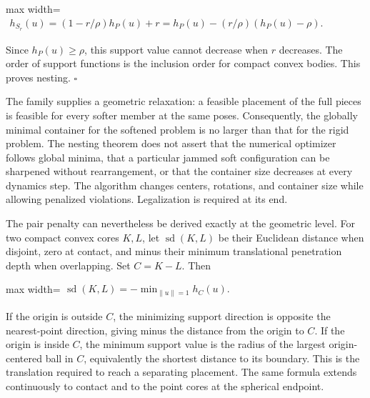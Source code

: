 \documentclass[11pt,a4paper]{article}
\begin{document}
\begin{center}\begin{adjustbox}{max width=\linewidth}$\displaystyle\begin{aligned}
h_{S_r}(u)=(1-r/\rho)h_P(u)+r
=h_P(u)-(r/\rho)(h_P(u)-\rho).
\end{aligned}$\end{adjustbox}\end{center}

Since \(h_P(u)\ge\rho\), this support value cannot decrease when \(r\) decreases. The order of support functions is the inclusion order for compact convex bodies. This proves nesting. \(\square\)

The family supplies a geometric relaxation: a feasible placement of the full pieces is feasible for every softer member at the same poses. Consequently, the globally minimal container for the softened problem is no larger than that for the rigid problem. The nesting theorem does not assert that the numerical optimizer follows global minima, that a particular jammed soft configuration can be sharpened without rearrangement, or that the container size decreases at every dynamics step. The algorithm changes centers, rotations, and container size while allowing penalized violations. Legalization is required at its end.

The pair penalty can nevertheless be derived exactly at the geometric level. For two compact convex cores \(K,L\), let \(\operatorname{sd}(K,L)\) be their Euclidean distance when disjoint, zero at contact, and minus their minimum translational penetration depth when overlapping. Set \(C=K-L\). Then

\begin{center}\begin{adjustbox}{max width=\linewidth}$\displaystyle\begin{aligned}
\operatorname{sd}(K,L)=-\min_{\|u\|=1}h_C(u).
\end{aligned}$\end{adjustbox}\end{center}

If the origin is outside \(C\), the minimizing support direction is opposite the nearest-point direction, giving minus the distance from the origin to \(C\). If the origin is inside \(C\), the minimum support value is the radius of the largest origin-centered ball in \(C\), equivalently the shortest distance to its boundary. This is the translation required to reach a separating placement. The same formula extends continuously to contact and to the point cores at the spherical endpoint.
\end{document}

